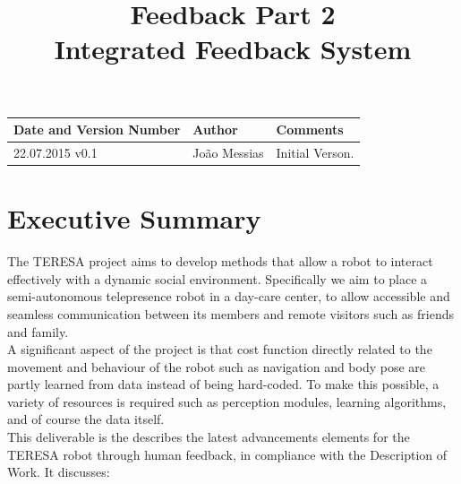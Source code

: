 \documentclass[a4paper,11pt]{report}
\title{Feedback Part 2\\ Integrated Feedback System}
\begin{document}
\maketitle
\makeheader


\begin{documentinfo}

\begin{tabular}{|p{5cm}|p{4cm}|p{5cm}|}
        \hline
        \rowcolor{gray!50}
        Date and Version Number & Author & Comments\\ \hline
        22.07.2015 v0.1 & Jo\~ao Messias & Initial Verson.\\
\end{tabular}

\end{documentinfo}


\pagebreak
\pagebreak

\tableofcontents

\pagebreak

\listoffigures

\pagebreak

\listoftables

\pagebreak




\section{Executive Summary}\label{sec:sum}

The TERESA project aims to develop methods that allow a robot to interact effectively with a dynamic social environment. Specifically we aim to place a semi-autonomous telepresence robot in a day-care center, to allow accessible and seamless communication between its members and remote visitors such as friends and family.\\

 A significant aspect of the project is that cost function directly related to the movement and behaviour of the robot such as navigation and body pose are partly learned from data instead of being hard-coded. To make this possible, a variety of resources is required such as perception modules, learning algorithms, and of course the data itself. \\

This deliverable is the describes the latest advancements 
elements for the TERESA robot through human feedback, in compliance with the 
Description of Work. It discusses:
\end{document}
